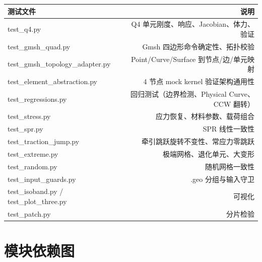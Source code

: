 \documentclass[12pt,a4paper]{ctexart}
\begin{document}
\begin{center}
\begin{tabular}{lr}
\hline
\textbf{测试文件} & \textbf{说明} \\
\hline
test\_q4.py & Q4 单元刚度、响应、Jacobian、体力、验证 \\
test\_gmsh\_quad.py & Gmsh 四边形命令确定性、拓扑校验 \\
test\_gmsh\_topology\_adapter.py & Point/Curve/Surface 到节点/边/单元映射 \\
test\_element\_abstraction.py & 4 节点 mock kernel 验证架构通用性 \\
test\_regressions.py & 回归测试（边界检测、Physical Curve、CCW 翻转） \\
test\_stress.py & 应力恢复、材料参数、载荷组合 \\
test\_spr.py & SPR 线性一致性 \\
test\_traction\_jump.py & 牵引跳跃旋转不变性、常应力零跳跃 \\
test\_extreme.py & 极端网格、退化单元、大变形 \\
test\_random.py & 随机网格一致性 \\
test\_input\_guards.py & .geo 分组与输入守卫 \\
test\_isoband.py / test\_plot\_three.py & 可视化 \\
test\_patch.py & 分片检验 \\
\hline
\end{tabular}
\end{center}

\section{模块依赖图}
\end{document}
